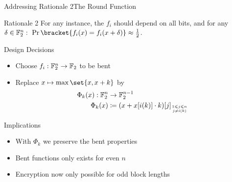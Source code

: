 \begin{frame}{Addressing Rationale 2}{The Round Function}
    \vspace{-60pt}
    \begin{minipage}{0.985\textwidth}
    \begin{exampleblock}{Rationale 2}
        For any instance, the $f_i$ should depend on all bits, and for any $\delta \in \F_2^n:\ \Pr\bracket{f_i(x) = f_i(x + \delta)} \approx \frac{1}{2}$.
    \end{exampleblock}
    \end{minipage}

    \begin{minipage}[t][85pt][t]{0.47\textwidth}
        \begin{block}{Design Decisions}
            \begin{itemize}
                \item Choose $f_i : \mathbb{F}_2^n \to \mathbb{F}_2$ to be bent
                \item Replace $x \mapsto \max \set{x, x+k}$ by
                        \begin{align*}
                            \Phi_k(x) : \F_2^n &\to \F_2^{n-1} \\
                            \Phi_k(x) &\coloneqq (x + x[i(k)] \cdot k)[j]_{\tower{1 \leqslant j \leqslant n}{j \neq i(k)}}
                        \end{align*}
            \end{itemize}
        \end{block}
    \end{minipage}
    \hfill
    \begin{minipage}[t][85pt][t]{0.47\textwidth}
        \begin{block}{Implications}
            \begin{itemize}
                \item With $\Phi_k$ we preserve the bent properties\\[5pt]
                \item Bent functions only exists for even $n$\\[5pt]
                \item Encryption now only possible for odd block lengths
            \end{itemize}
        \end{block}
    \end{minipage}
\end{frame}

